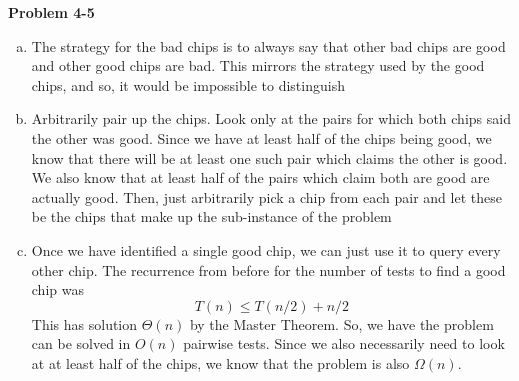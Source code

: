 \documentclass{article}
\begin{document}
\noindent\textbf{Problem 4-5}\\

\begin{enumerate}[a.]

\item
The strategy for the bad chips is to always say that other bad chips are good and other good chips are bad. This mirrors the strategy used by the good chips, and so, it would be impossible to distinguish

\item
Arbitrarily pair up the chips. Look only at the pairs for which both chips said the other was good. Since we have at least half of the chips being good, we know that there will be at least one such pair which claims the other is good. We also know that at least half of the pairs which claim both are good are actually good. Then, just arbitrarily pick a chip from each pair and let these be the chips that make up the sub-instance of the problem

\item
Once we have identified a single good chip, we can just use it to query every other chip. 
The recurrence from before for the number of tests to find a good chip was
\[
T(n) \le T(n/2) + n/2
\]
This has solution $\Theta(n)$ by the Master Theorem. So, we have the problem can be solved in $O(n)$ pairwise tests. Since we also necessarily need to look at at least half of the chips, we know that the problem is also $\Omega(n)$.

\end{enumerate}
\end{document}
